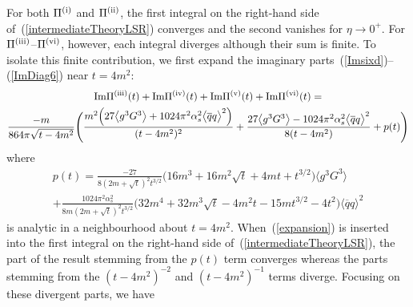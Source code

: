 \documentclass[11pt, letterpaper]{article}
\newcommand{\glueSixD}{\big\langle g^{3} G^{3} \big\rangle}
\newcommand{\rom}[1]{\uppercase\expandafter{\romannumeral #1\relax}}
\begin{document}
For both $\Pi^{\text{(\rom{1})}}$ and $\Pi^{\text{(\rom{2})}}$, 
the first integral on the right-hand side 
of~(\ref{intermediateTheoryLSR}) converges and the second vanishes
for $\eta\rightarrow 0^{+}$.
For $\Pi^{\text{(\rom{3})}}$--$\Pi^{\text{(\rom{6})}}$,
however, each integral diverges although their sum is finite.
To isolate this finite contribution, 
we first expand the imaginary parts~(\ref{Imsixd})--(\ref{ImDiag6}) near $t=4m^2$:
\begin{multline}\label{expansion}
  \text{Im}\Pi^{\text{(\rom{3})}}(t) + \text{Im}\Pi^{\text{(\rom{4})}}(t) + \text{Im}\Pi^{\text{(\rom{5})}}(t) + \text{Im}\Pi^{\text{(\rom{6})}}(t)=\\
  \frac{-m}{864\pi\sqrt{t-4m^2}} \Bigg(
   \frac{m^2 \Big(27 \glueSixD + 1024 \pi^2 \alpha_s^2 \big\langle \overline{q}q \big\rangle^2 \Big)}{(t-4m^2)^2} + 
  \frac{27 \glueSixD - 1024 \pi^2 \alpha_s^2 \big\langle \overline{q}q \big\rangle^2}{8(t-4m^2)}
  + p(t)\Bigg)
\end{multline}
where 
%
\begin{multline}\label{pExplicit}
p(t)= \frac{-27}{8 (2m + \sqrt{t})^2 t^{3/2}} 
\bigg( 
16 m^3 + 16 m^2 \sqrt{t} + 4 m t + t^{3/2}
\bigg) 
\glueSixD \\
+ \frac{1024 \pi^2 \alpha_s^2}{8m (2m + \sqrt{t})^2 t^{3/2}} 
\bigg( 
32 m^4 + 32 m^3 \sqrt{t} - 4 m^2 t - 15 m t^{3/2} - 4 t^2
\bigg)  
\big\langle \overline{q}q \big\rangle^2
\end{multline}
%
is analytic in a neighbourhood about $t=4m^2$.
When~(\ref{expansion}) is inserted into the first integral on the right-hand side 
of~(\ref{intermediateTheoryLSR}),
the part of the result stemming from the $p(t)$ term
converges whereas the parts stemming from the $(t-4m^2)^{-2}$ 
and $(t-4m^2)^{-1}$ terms diverge.
Focusing on these divergent parts, we have
%
\end{document}
